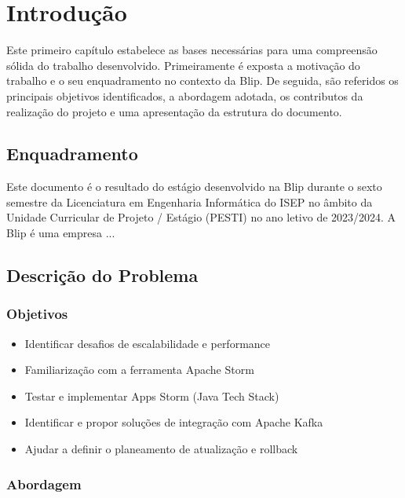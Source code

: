 \chapter{Introdução} 	
\label{sec:1-Introducao} %

Este primeiro capítulo estabelece as bases necessárias para uma compreensão sólida do trabalho 
desenvolvido. Primeiramente é exposta a motivação do trabalho e o seu enquadramento no contexto
da Blip. De seguida, são referidos os principais objetivos identificados, a abordagem adotada, 
os contributos da realização do projeto e uma apresentação da estrutura do documento.

\section{Enquadramento}

Este documento é o resultado do estágio desenvolvido na Blip durante o sexto semestre da Licenciatura 
em Engenharia Informática do ISEP no âmbito da Unidade Curricular de Projeto / Estágio (PESTI) 
no ano letivo de 2023/2024. A Blip é uma empresa ...

\section{Descrição do Problema}



\subsection{Objetivos}
\label{sec:1-obj}

\begin{itemize}
  \item Identificar desafios de escalabilidade e performance
  \item Familiarização com a ferramenta Apache Storm 
  \item Testar e implementar Apps Storm (Java Tech Stack) 
  \item Identificar e propor soluções de integração com Apache Kafka 
  \item Ajudar a definir o planeamento de atualização e rollback 
\end{itemize}

\subsection{Abordagem}



